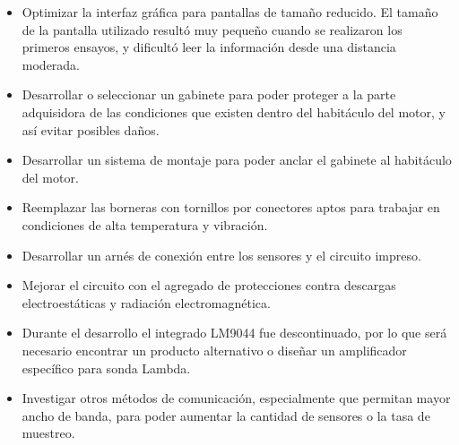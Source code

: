 \begin{itemize}
\item Optimizar la interfaz gráfica para pantallas de tamaño reducido. El tamaño de la pantalla utilizado resultó muy pequeño cuando se realizaron los primeros ensayos, y dificultó leer la información desde una distancia moderada.

\item Desarrollar o seleccionar un gabinete para poder proteger a la parte adquisidora de las condiciones que existen dentro del habitáculo del motor, y así evitar posibles daños.

\item Desarrollar un sistema de montaje para poder anclar el gabinete al habitáculo del motor.

\item Reemplazar las borneras con tornillos por conectores aptos para trabajar en condiciones de alta temperatura y vibración.

\item Desarrollar un arnés de conexión entre los sensores y el circuito impreso.

\item Mejorar el circuito con el agregado de protecciones contra descargas electroestáticas y radiación electromagnética.

\item Durante el desarrollo el integrado LM9044 fue descontinuado, por lo que será necesario encontrar un producto alternativo o diseñar un amplificador específico para sonda Lambda.

\item Investigar otros métodos de comunicación, especialmente que permitan mayor ancho de banda, para poder aumentar la cantidad de sensores o la tasa de muestreo.

\end{itemize}



